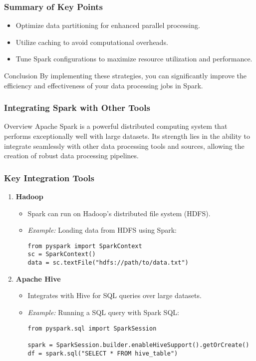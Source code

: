 \documentclass[aspectratio=169]{beamer}
\begin{document}
\begin{frame}[fragile]
    \frametitle{Summary of Key Points}
    \begin{itemize}
        \item Optimize data partitioning for enhanced parallel processing.
        \item Utilize caching to avoid computational overheads.
        \item Tune Spark configurations to maximize resource utilization and performance.
    \end{itemize}
    \begin{block}{Conclusion}
        By implementing these strategies, you can significantly improve the efficiency and effectiveness of your data processing jobs in Spark.
    \end{block}
\end{frame}

\begin{frame}
    \frametitle{Integrating Spark with Other Tools}
    \begin{block}{Overview}
        Apache Spark is a powerful distributed computing system that performs exceptionally well with large datasets. Its strength lies in the ability to integrate seamlessly with other data processing tools and sources, allowing the creation of robust data processing pipelines.
    \end{block}
\end{frame}

\begin{frame}
    \frametitle{Key Integration Tools}
    \begin{enumerate}
        \item \textbf{Hadoop}
        \begin{itemize}
            \item Spark can run on Hadoop's distributed file system (HDFS).
            \item \textit{Example:} Loading data from HDFS using Spark:
            \begin{lstlisting}[basicstyle=\tiny]
from pyspark import SparkContext
sc = SparkContext()
data = sc.textFile("hdfs://path/to/data.txt")
            \end{lstlisting}
        \end{itemize}
        
        \item \textbf{Apache Hive}
        \begin{itemize}
            \item Integrates with Hive for SQL queries over large datasets.
            \item \textit{Example:} Running a SQL query with Spark SQL:
            \begin{lstlisting}[basicstyle=\tiny]
from pyspark.sql import SparkSession

spark = SparkSession.builder.enableHiveSupport().getOrCreate()
df = spark.sql("SELECT * FROM hive_table")
            \end{lstlisting}
        \end{itemize}
    \end{enumerate}
\end{frame}
\end{document}
